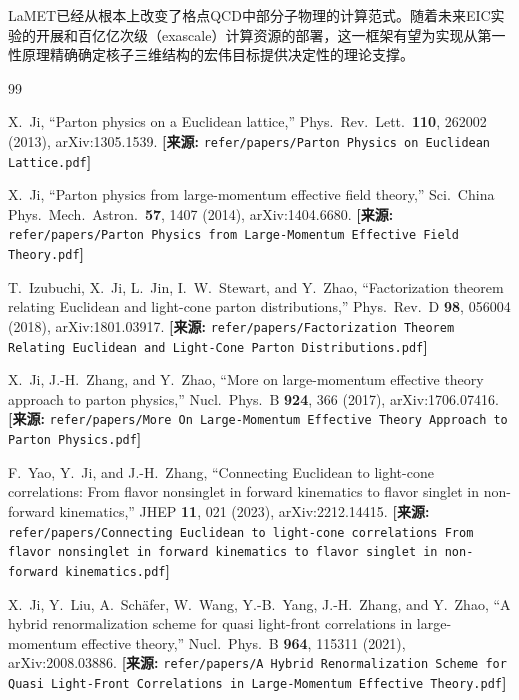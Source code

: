 \documentclass[12pt,a4paper]{ctexart}
\theoremstyle{definition}
\begin{document}
LaMET已经从根本上改变了格点QCD中部分子物理的计算范式。随着未来EIC实验的开展和百亿亿次级（exascale）计算资源的部署，这一框架有望为实现从第一性原理精确确定核子三维结构的宏伟目标提供决定性的理论支撑。

\begin{thebibliography}{99}


X.~Ji,
``Parton physics on a Euclidean lattice,''
Phys.\ Rev.\ Lett.\ \textbf{110}, 262002 (2013), arXiv:1305.1539.
\quad\textbf{[来源:} \texttt{refer/papers/Parton Physics on Euclidean Lattice.pdf}\textbf{]}

X.~Ji,
``Parton physics from large-momentum effective field theory,''
Sci.\ China Phys.\ Mech.\ Astron.\ \textbf{57}, 1407 (2014), arXiv:1404.6680.
\quad\textbf{[来源:} \texttt{refer/papers/Parton Physics from Large-Momentum Effective Field Theory.pdf}\textbf{]}

T.~Izubuchi, X.~Ji, L.~Jin, I.~W.~Stewart, and Y.~Zhao,
``Factorization theorem relating Euclidean and light-cone parton distributions,''
Phys.\ Rev.\ D \textbf{98}, 056004 (2018), arXiv:1801.03917.
\quad\textbf{[来源:} \texttt{refer/papers/Factorization Theorem Relating Euclidean and Light-Cone Parton Distributions.pdf}\textbf{]}

X.~Ji, J.-H.~Zhang, and Y.~Zhao,
``More on large-momentum effective theory approach to parton physics,''
Nucl.\ Phys.\ B \textbf{924}, 366 (2017), arXiv:1706.07416.
\quad\textbf{[来源:} \texttt{refer/papers/More On Large-Momentum Effective Theory Approach to Parton Physics.pdf}\textbf{]}

F.~Yao, Y.~Ji, and J.-H.~Zhang,
``Connecting Euclidean to light-cone correlations: From flavor nonsinglet in forward kinematics to flavor singlet in non-forward kinematics,''
JHEP \textbf{11}, 021 (2023), arXiv:2212.14415.
\quad\textbf{[来源:} \texttt{refer/papers/Connecting Euclidean to light-cone correlations From flavor nonsinglet in forward kinematics to flavor singlet in non-forward kinematics.pdf}\textbf{]}


X.~Ji, Y.~Liu, A.~Sch\"afer, W.~Wang, Y.-B.~Yang, J.-H.~Zhang, and Y.~Zhao,
``A hybrid renormalization scheme for quasi light-front correlations in large-momentum effective theory,''
Nucl.\ Phys.\ B \textbf{964}, 115311 (2021), arXiv:2008.03886.
\quad\textbf{[来源:} \texttt{refer/papers/A Hybrid Renormalization Scheme for Quasi Light-Front Correlations in Large-Momentum Effective Theory.pdf}\textbf{]}


\end{thebibliography}
\end{document}
